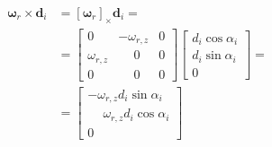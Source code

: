 \documentclass[11pt,a4paper]{article}
\newcommand{\vect}[1]{\bm{#1}}       %
\newcommand{\skewsym}[1]{\left[#1\right]_\times}
\begin{document}
\begin{equation}
    \begin{aligned}
        \vect{\omega}_r \times \vect{d}_{i} & = \skewsym{\vect{\omega}_r} \vect{d}_{i} =   \\
                                            & = \begin{bmatrix}
                                                    0            & -\omega_{r,z} & 0 \\
                                                    \omega_{r,z} & \phantom{-}0  & 0 \\
                                                    0            & \phantom{-}0  & 0
                                                \end{bmatrix} \begin{bmatrix}
                                                                  d_{i}\cos\alpha_i \\
                                                                  d_{i}\sin\alpha_i \\
                                                                  0
                                                              \end{bmatrix}           =    \\
                                            & = \begin{bmatrix}
                                                    -\omega_{r,z} d_{i} \sin\alpha_i           \\
                                                    \phantom{-}\omega_{r,z} d_{i} \cos\alpha_i \\
                                                    0
                                                \end{bmatrix}
    \end{aligned}
\end{equation}
\end{document}
